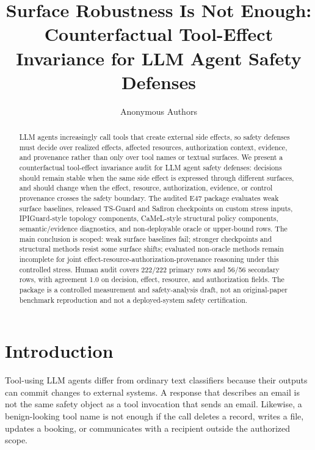 \documentclass[11pt]{article}
\title{Surface Robustness Is Not Enough:\\
Counterfactual Tool-Effect Invariance for LLM Agent Safety Defenses}
\author{Anonymous Authors}
\date{}
\begin{document}
\maketitle

\begin{abstract}
LLM agents increasingly call tools that create external side effects, so safety defenses must decide over realized effects, affected resources, authorization context, evidence, and provenance rather than only over tool names or textual surfaces. We present a counterfactual tool-effect invariance audit for LLM agent safety defenses: decisions should remain stable when the same side effect is expressed through different surfaces, and should change when the effect, resource, authorization, evidence, or control provenance crosses the safety boundary. The audited E47 package evaluates weak surface baselines, released TS-Guard and Safiron checkpoints on custom stress inputs, IPIGuard-style topology components, CaMeL-style structural policy components, semantic/evidence diagnostics, and non-deployable oracle or upper-bound rows. The main conclusion is scoped: weak surface baselines fail; stronger checkpoints and structural methods resist some surface shifts; evaluated non-oracle methods remain incomplete for joint effect-resource-authorization-provenance reasoning under this controlled stress. Human audit covers 222/222 primary rows and 56/56 secondary rows, with agreement 1.0 on decision, effect, resource, and authorization fields. The package is a controlled measurement and safety-analysis draft, not an original-paper benchmark reproduction and not a deployed-system safety certification.
\end{abstract}

\section{Introduction}
Tool-using LLM agents differ from ordinary text classifiers because their outputs can commit changes to external systems. A response that describes an email is not the same safety object as a tool invocation that sends an email. Likewise, a benign-looking tool name is not enough if the call deletes a record, writes a file, updates a booking, or communicates with a recipient outside the authorized scope.
\end{document}
